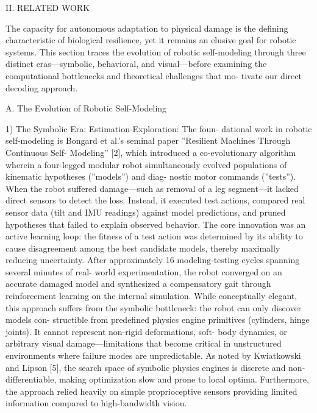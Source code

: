 \documentclass[10pt,twocolumn,letterpaper]{article}
\begin{document}
II. RELATED WORK

The capacity for autonomous adaptation to physical damage is the defining characteristic of biological resilience, yet it remains an elusive goal for robotic systems. This section traces the evolution of robotic self-modeling through three distinct eras—symbolic, behavioral, and visual—before examining the computational bottlenecks and theoretical challenges that mo- tivate our direct decoding approach.

A. The Evolution of Robotic Self-Modeling

1) The Symbolic Era: Estimation-Exploration: The foun- dational work in robotic self-modeling is Bongard et al.’s seminal paper ”Resilient Machines Through Continuous Self- Modeling” [2], which introduced a co-evolutionary algorithm wherein a four-legged modular robot simultaneously evolved populations of kinematic hypotheses (”models”) and diag- nostic motor commands (”tests”). When the robot suffered damage—such as removal of a leg segment—it lacked direct sensors to detect the loss. Instead, it executed test actions, compared real sensor data (tilt and IMU readings) against model predictions, and pruned hypotheses that failed to explain observed behavior. The core innovation was an active learning loop: the fitness of a test action was determined by its ability to cause disagreement among the best candidate models, thereby maximally reducing uncertainty. After approximately 16 modeling-testing cycles spanning several minutes of real- world experimentation, the robot converged on an accurate damaged model and synthesized a compensatory gait through reinforcement learning on the internal simulation. While conceptually elegant, this approach suffers from the symbolic bottleneck: the robot can only discover models con- structible from predefined physics engine primitives (cylinders, hinge joints). It cannot represent non-rigid deformations, soft- body dynamics, or arbitrary visual damage—limitations that become critical in unstructured environments where failure modes are unpredictable. As noted by Kwiatkowski and Lipson [5], the search space of symbolic physics engines is discrete and non-differentiable, making optimization slow and prone to local optima. Furthermore, the approach relied heavily on simple proprioceptive sensors providing limited information compared to high-bandwidth vision.
\end{document}
